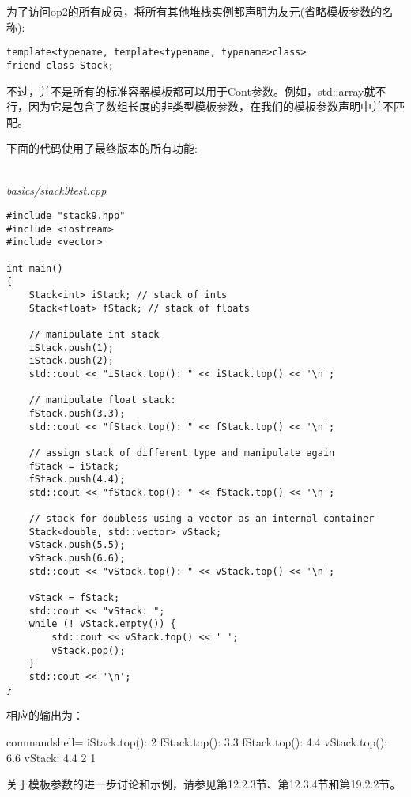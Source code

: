 为了访问op2的所有成员，将所有其他堆栈实例都声明为友元(省略模板参数的名称):

\begin{lstlisting}[style=styleCXX]
template<typename, template<typename, typename>class>
friend class Stack;
\end{lstlisting}

不过，并不是所有的标准容器模板都可以用于Cont参数。例如，std::array就不行，因为它是包含了数组长度的非类型模板参数，在我们的模板参数声明中并不匹配。

下面的代码使用了最终版本的所有功能:

\hspace*{\fill} \\ %
\noindent
\textit{basics/stack9test.cpp}
\begin{lstlisting}[style=styleCXX]
#include "stack9.hpp"
#include <iostream>
#include <vector>

int main()
{
	Stack<int> iStack; // stack of ints
	Stack<float> fStack; // stack of floats
	
	// manipulate int stack
	iStack.push(1);
	iStack.push(2);
	std::cout << "iStack.top(): " << iStack.top() << '\n';
	
	// manipulate float stack:
	fStack.push(3.3);
	std::cout << "fStack.top(): " << fStack.top() << '\n';
	
	// assign stack of different type and manipulate again
	fStack = iStack;
	fStack.push(4.4);
	std::cout << "fStack.top(): " << fStack.top() << '\n';
	
	// stack for doubless using a vector as an internal container
	Stack<double, std::vector> vStack;
	vStack.push(5.5);
	vStack.push(6.6);
	std::cout << "vStack.top(): " << vStack.top() << '\n';
	
	vStack = fStack;
	std::cout << "vStack: ";
	while (! vStack.empty()) {
		std::cout << vStack.top() << ' ';
		vStack.pop();
	}
	std::cout << '\n';
}
\end{lstlisting}

相应的输出为：

\begin{tcblisting}{commandshell={}}
iStack.top(): 2
fStack.top(): 3.3
fStack.top(): 4.4
vStack.top(): 6.6
vStack: 4.4 2 1
\end{tcblisting}

关于模板参数的进一步讨论和示例，请参见第12.2.3节、第12.3.4节和第19.2.2节。






















